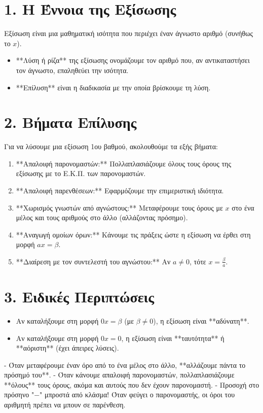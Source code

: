 \documentclass[11pt,a4paper,modern]{FFExercises}
\begin{document}

\section*{1. Η Έννοια της Εξίσωσης}
Εξίσωση είναι μια μαθηματική ισότητα που περιέχει έναν άγνωστο αριθμό (συνήθως το $x$).
\begin{itemize}
    \item **Λύση ή ρίζα** της εξίσωσης ονομάζουμε τον αριθμό που, αν αντικαταστήσει τον άγνωστο, επαληθεύει την ισότητα.
    \item **Επίλυση** είναι η διαδικασία με την οποία βρίσκουμε τη λύση.
\end{itemize}

\section*{2. Βήματα Επίλυσης}
Για να λύσουμε μια εξίσωση 1ου βαθμού, ακολουθούμε τα εξής βήματα:
\begin{enumerate}
    \item **Απαλοιφή παρονομαστών:** Πολλαπλασιάζουμε όλους τους όρους της εξίσωσης με το Ε.Κ.Π. των παρονομαστών.
    \item **Απαλοιφή παρενθέσεων:** Εφαρμόζουμε την επιμεριστική ιδιότητα.
    \item **Χωρισμός γνωστών από αγνώστους:** Μεταφέρουμε τους όρους με $x$ στο ένα μέλος και τους αριθμούς στο άλλο (αλλάζοντας πρόσημο).
    \item **Αναγωγή ομοίων όρων:** Κάνουμε τις πράξεις ώστε η εξίσωση να έρθει στη μορφή $ax = \beta$.
    \item **Διαίρεση με τον συντελεστή του αγνώστου:** Αν $a \neq 0$, τότε $x = \frac{\beta}{a}$.
\end{enumerate}

\section*{3. Ειδικές Περιπτώσεις}
\begin{itemize}
    \item Αν καταλήξουμε στη μορφή $0x = \beta$ (με $\beta \neq 0$), η εξίσωση είναι **αδύνατη**.
    \item Αν καταλήξουμε στη μορφή $0x = 0$, η εξίσωση είναι **ταυτότητα** ή **αόριστη** (έχει άπειρες λύσεις).
\end{itemize}

\begin{tcolorbox}[colback=red!5!white,colframe=red!75!black,title=Προσοχή στα Λάθη!]
    - Όταν μεταφέρουμε έναν όρο από το ένα μέλος στο άλλο, **αλλάζουμε πάντα το πρόσημό του**.
    - Όταν κάνουμε απαλοιφή παρονομαστών, πολλαπλασιάζουμε **όλους** τους όρους, ακόμα και αυτούς που δεν έχουν παρονομαστή.
    - Προσοχή στο πρόσηνο "$-$" μπροστά από κλάσμα! Όταν φεύγει ο παρονομαστής, οι όροι του αριθμητή πρέπει να μπουν σε παρένθεση.
\end{tcolorbox}
\end{document}

